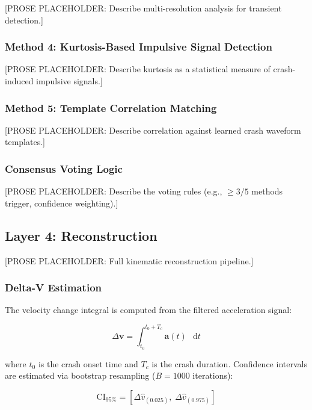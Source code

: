\documentclass[conference,twocolumn]{IEEEtran}
\newcommand{\vect}[1]{\boldsymbol{#1}}
\newcommand{\diff}{\mathop{}\!\mathrm{d}}
\begin{document}
[PROSE PLACEHOLDER: Describe multi-resolution analysis for transient detection.]

\subsubsection{Method 4: Kurtosis-Based Impulsive Signal Detection}

[PROSE PLACEHOLDER: Describe kurtosis as a statistical measure of crash-induced impulsive signals.]

\subsubsection{Method 5: Template Correlation Matching}

[PROSE PLACEHOLDER: Describe correlation against learned crash waveform templates.]

\subsubsection{Consensus Voting Logic}

[PROSE PLACEHOLDER: Describe the voting rules (e.g., $\geq 3/5$ methods trigger, confidence weighting).]

\subsection{Layer 4: Reconstruction}

[PROSE PLACEHOLDER: Full kinematic reconstruction pipeline.]

\subsubsection{Delta-V Estimation}

The velocity change integral is computed from the filtered acceleration signal:

\begin{equation}
\label{eq:deltav}
\Delta \vect{v} = \int_{t_0}^{t_0 + T_c} \vect{a}(t)\, \diff t
\end{equation}

where $t_0$ is the crash onset time and $T_c$ is the crash duration. Confidence intervals are estimated via bootstrap resampling ($B = 1000$ iterations):

\begin{equation}
\label{eq:ci-bootstrap}
\text{CI}_{95\%} = \left[ \Delta \hat{v}_{(0.025)},\; \Delta \hat{v}_{(0.975)} \right]
\end{equation}
\end{document}
